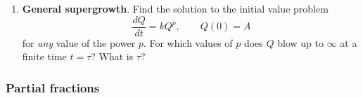 \begin{enumerate}
\begin{enumerate}
  \item Suppose the values of $k$ and $A$ are known only imprecisely, and
they could be in error by as much as 5\%.  That makes the value of
$\tau$ uncertain.  Which error causes the greater uncertainty: the
error in $k$ or the error in $A$?  (See the discussion of error
analysis for the supergrowth model on pages \pageref{supergrowth
  errors-begin}--\pageref{supergrowth errors-end}.)


\end{enumerate}
\item {\bf General supergrowth}.  Find the solution to the initial
value problem
	\[
\dfrac{dQ}{dt} = k Q^p, \qquad Q(0) = A
\]
for {\em any\/} value of the power $p$.  For which values of $p$ does
$Q$ blow up to $\infty$ at a finite time $t = \tau$?  What is $\tau$?



\end{enumerate}
\subsubsection{Partial fractions}
\label{subsubsec:partial-fractions}


